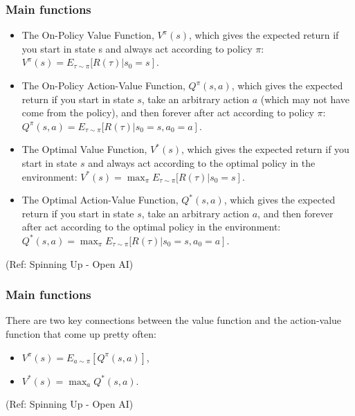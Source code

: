 \begin{frame}[fragile]\frametitle{Main functions}

\begin{itemize}
\item The On-Policy Value Function, $V^{\pi}(s)$, which gives the expected return if you start in state s and always act according to policy $\pi$:$V^{\pi}(s) = E_{\tau \sim \pi}[R(\tau)\left| s_0 = s\right]$.
\item The On-Policy Action-Value Function, $Q^{\pi}(s,a)$, which gives the expected return if you start in state $s$, take an arbitrary action $a$ (which may not have come from the policy), and then forever after act according to policy $\pi$: $Q^{\pi}(s,a) = E_{\tau \sim \pi}[R(\tau)\left| s_0 = s, a_0 = a\right]$.
\item The Optimal Value Function, $V^*(s)$, which gives the expected return if you start in state $s$ and always act according to the optimal policy in the environment:
$V^*(s) = \max_{\pi} E_{\tau \sim \pi}[R(\tau)\left| s_0 = s\right]$.
\item The Optimal Action-Value Function, $Q^*(s,a)$, which gives the expected return if you start in state $s$, take an arbitrary action $a$, and then forever after act according to the optimal policy in the environment: $Q^*(s,a) = \max_{\pi} E_{\tau \sim \pi}[R(\tau)\left| s_0 = s, a_0 = a\right]$.
\end{itemize}

{\tiny (Ref: Spinning Up - Open AI)}
\end{frame}



\begin{frame}[fragile]\frametitle{Main functions}

There are two key connections between the value function and the action-value function that come up pretty often:

\begin{itemize}
\item $V^{\pi}(s) = E_{a\sim \pi}[Q^{\pi}(s,a)]$,
\item $V^*(s) = \max_a Q^* (s,a).$
\end{itemize}

{\tiny (Ref: Spinning Up - Open AI)}
\end{frame}


